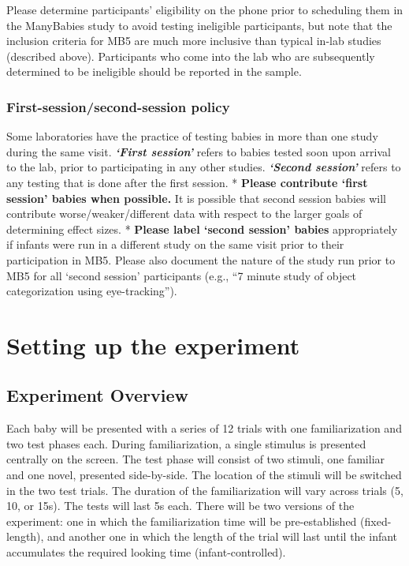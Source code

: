 \documentclass[
]{book}
\begin{document}
Please determine participants' eligibility on the phone prior to scheduling them in the ManyBabies study to avoid testing ineligible participants, but note that the inclusion criteria for MB5 are much more inclusive than typical in-lab studies (described above). Participants who come into the lab who are subsequently determined to be ineligible should be reported in the sample.

\subsection{First-session/second-session policy}\label{first-sessionsecond-session-policy}

Some laboratories have the practice of testing babies in more than one study during the same visit. \textbf{\emph{`First session'}} refers to babies tested soon upon arrival to the lab, prior to participating in any other studies. \textbf{\emph{`Second session'}} refers to any testing that is done after the first session.
* \textbf{Please contribute `first session' babies when possible.} It is possible that second session babies will contribute worse/weaker/different data with respect to the larger goals of determining effect sizes.
* \textbf{Please label `second session' babies} appropriately if infants were run in a different study on the same visit prior to their participation in MB5. Please also document the nature of the study run prior to MB5 for all `second session' participants (e.g., ``7 minute study of object categorization using eye-tracking'').

\chapter{Setting up the experiment}\label{setting-up-the-experiment}

\section{Experiment Overview}\label{experiment-overview}

Each baby will be presented with a series of 12 trials with one familiarization and two test phases each. During familiarization, a single stimulus is presented centrally on the screen. The test phase will consist of two stimuli, one familiar and one novel, presented side-by-side. The location of the stimuli will be switched in the two test trials. The duration of the familiarization will vary across trials (5, 10, or 15s). The tests will last 5s each. There will be two versions of the experiment: one in which the familiarization time will be pre-established (fixed-length), and another one in which the length of the trial will last until the infant accumulates the required looking time (infant-controlled).
\end{document}
